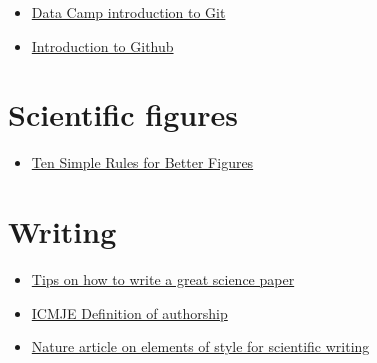 \documentclass[
]{book}
\providecommand{\tightlist}{%
  \setlength{\itemsep}{0pt}\setlength{\parskip}{0pt}}
\begin{document}
\begin{itemize}
\tightlist
\item
  \href{https://www.datacamp.com/courses/introduction-to-git-for-data-science}{Data Camp introduction to Git}
\item
  \href{https://lab.github.com/githubtraining/introduction-to-github}{Introduction to Github}
\end{itemize}

\hypertarget{scientific-figures}{%
\section{Scientific figures}\label{scientific-figures}}

\begin{itemize}
\tightlist
\item
  \href{https://journals.plos.org/ploscompbiol/article?id=10.1371/journal.pcbi.1003833}{Ten Simple Rules for Better Figures}
\end{itemize}

\hypertarget{writing}{%
\section{Writing}\label{writing}}

\begin{itemize}
\tightlist
\item
  \href{https://www.nature.com/articles/d41586-019-02918-5}{Tips on how to write a great science paper}
\item
  \href{http://www.icmje.org/recommendations/browse/roles-and-responsibilities/defining-the-role-of-authors-and-contributors.html}{ICMJE Definition of authorship}
\item
  \href{https://www.nature.com/articles/nphys724}{Nature article on elements of style for scientific writing}
\end{itemize}

  
\end{document}
